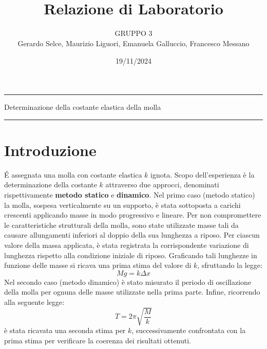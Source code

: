 \documentclass[11pt]{article}
\begin{document}
\setlength{\parindent}{0pt}
\title{\vspace{-4em}{\large Laboratorio di Meccanica e Termodinamica} \\
    Relazione di Laboratorio}
\author{GRUPPO 3 \\
        Gerardo Selce, Maurizio Liguori, Emanuela Galluccio, Francesco Messano}
\date{19/11/2024}
\maketitle

\vspace{-2em}\par\noindent\rule{\textwidth}{0.4pt}
\begin{center}
    {\Large\sc Determinazione della costante elastica della molla}  
\end{center}
\par\noindent\rule{\textwidth}{0.4pt}

\section{Introduzione}

É assegnata una molla con costante elastica $k$ ignota. Scopo dell'esperienza è la determinazione della costante $k$ attraverso due approcci, denominati rispettivamente \textbf{metodo statico} e \textbf{dinamico}. Nel primo caso (metodo statico) la molla, sospesa verticalmente su un supporto, è stata sottoposta a carichi crescenti applicando masse in modo progressivo e lineare.
Per non compromettere le caratteristiche strutturali della molla, sono state utilizzate masse tali da causare allungamenti inferiori al doppio della sua lunghezza a riposo. Per ciascun valore della massa applicata, è stata registrata la corrispondente variazione di lunghezza rispetto alla condizione iniziale di riposo. Graficando tali lunghezze in funzione delle masse si ricava una prima stima del valore di $k$, sfruttando la legge:
\begin{equation}
    Mg = k\Delta x
\end{equation}
Nel secondo caso (metodo dinamico) è stato misurato il periodo di oscillazione della molla per ognuna delle masse utilizzate nella prima parte. Infine, ricorrendo alla seguente legge:
\begin{equation}
    T = 2\pi \sqrt{\frac{M}{k}}
\end{equation}
è stata ricavata una seconda stima per $k$, successivamente confrontata con la prima stima per verificare la coerenza dei risultati ottenuti.
\end{document}
